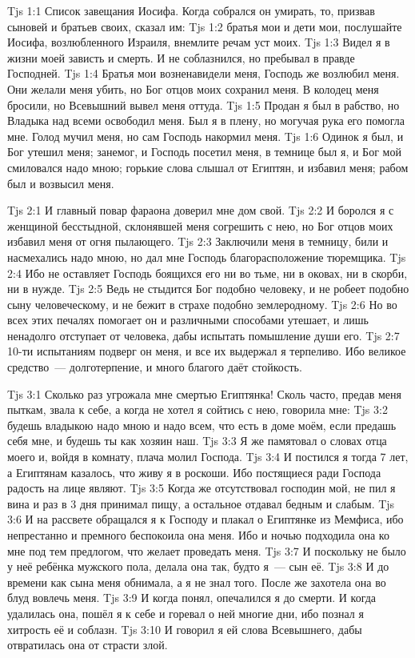 \vs Tjs 1:1
Список завещания Иосифа.
Когда собрался он умирать, то,
призвав сыновей и братьев своих,
сказал им:
\vs Tjs 1:2
братья мои и дети мои,
послушайте Иосифа, возлюбленного Израиля, внемлите речам уст моих.
\vs Tjs 1:3
Видел я в жизни моей зависть и смерть.
И не соблазнился, но пребывал в правде Господней.
\vs Tjs 1:4
Братья мои возненавидели меня, Господь же возлюбил меня.
Они желали меня убить, но Бог отцов моих сохранил меня.
В колодец меня бросили, но Всевышний вывел меня оттуда.
\vs Tjs 1:5
Продан я был в рабство, но Владыка над всеми освободил меня.
Был я в плену, но могучая рука его помогла мне.
Голод мучил меня, но сам Господь накормил меня.
\vs Tjs 1:6
Одинок я был, и Бог утешил меня;
занемог, и Господь посетил меня,
в темнице был я, и Бог мой смиловался надо мною;
горькие слова слышал от Египтян, и избавил меня;
рабом был и возвысил меня.

\vs Tjs 2:1
И главный повар фараона доверил мне дом свой.
\vs Tjs 2:2
И боролся я с женщиной бесстыдной, склонявшей меня согрешить с нею,
но Бог отцов моих избавил меня от огня пылающего.
\vs Tjs 2:3
Заключили меня в темницу, били и насмехались надо мною,
но дал мне Господь благорасположение тюремщика.
\vs Tjs 2:4
Ибо не оставляет Господь боящихся его ни во тьме, ни в оковах,
ни в скорби, ни в нужде.
\vs Tjs 2:5
Ведь не стыдится Бог подобно человеку, и не робеет подобно сыну
человеческому, и не бежит в страхе подобно землеродному.
\vs Tjs 2:6
Но во всех этих печалях помогает он и различными способами утешает,
и лишь ненадолго отступает от человека,
дабы испытать помышление души его.
\vs Tjs 2:7
10-ти испытаниям подверг он меня,
и все их выдержал я терпеливо.
Ибо великое средство~--- долготерпение,
и много благого даёт стойкость.

\vs Tjs 3:1
Сколько раз угрожала мне смертью Египтянка!
Сколь часто, предав меня пыткам, звала к себе,
а когда не хотел я сойтись с нею, говорила мне:
\vs Tjs 3:2
будешь владыкою надо мною и надо всем, что есть в доме моём,
если предашь себя мне, и будешь ты как хозяин наш.
\vs Tjs 3:3
Я же памятовал о словах отца моего и,
войдя в комнату, плача молил Господа.
\vs Tjs 3:4
И постился я тогда 7 лет,
а Египтянам казалось, что живу я в роскоши.
Ибо постящиеся ради Господа радость на лице являют.
\vs Tjs 3:5
Когда же отсутствовал господин мой, не пил я вина
и раз в 3 дня принимал пищу,
а остальное отдавал бедным и слабым.
\vs Tjs 3:6
И на рассвете обращался я к Господу
и плакал о Египтянке из Мемфиса,
ибо непрестанно и премного беспокоила она меня.
Ибо и ночью подходила она ко мне под тем предлогом,
что желает проведать меня.
\vs Tjs 3:7
И поскольку не было у неё ребёнка мужского пола,
делала она так, будто я~--- сын её.
\vs Tjs 3:8
И до времени как сына меня обнимала, а я не знал того.
После же захотела она во блуд вовлечь меня.
\vs Tjs 3:9
И когда понял, опечалился я до смерти.
И когда удалилась она, пошёл я к себе
и горевал о ней многие дни,
ибо познал я хитрость её и соблазн.
\vs Tjs 3:10
И говорил я ей слова Всевышнего,
дабы отвратилась она от страсти злой.

